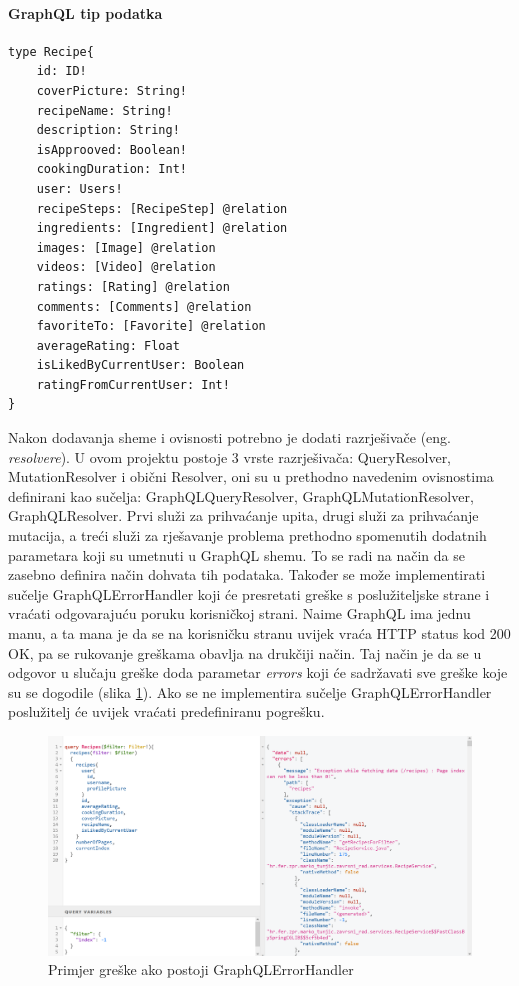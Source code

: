 \documentclass[times, utf8, zavrsni]{fer}
\begin{document}
\paragraph{GraphQL tip podatka}
\label{graphqlType}
\begin{Verbatim}[fontsize=\scriptsize]
type Recipe{
    id: ID!
    coverPicture: String!
    recipeName: String!
    description: String!
    isApprooved: Boolean!
    cookingDuration: Int!
    user: Users!
    recipeSteps: [RecipeStep] @relation
    ingredients: [Ingredient] @relation
    images: [Image] @relation
    videos: [Video] @relation
    ratings: [Rating] @relation
    comments: [Comments] @relation
    favoriteTo: [Favorite] @relation
    averageRating: Float
    isLikedByCurrentUser: Boolean
    ratingFromCurrentUser: Int!
}
\end{Verbatim}
Nakon dodavanja sheme i ovisnosti potrebno je dodati razrješivače (eng. \textit{resolvere}). U ovom projektu postoje 3 vrste razrješivača:
QueryResolver, MutationResolver i obični Resolver, oni su u prethodno navedenim ovisnostima definirani kao sučelja:
GraphQLQueryResolver, GraphQLMutationResolver, GraphQLResolver. Prvi služi za prihvaćanje upita, drugi služi za prihvaćanje
mutacija, a treći služi za rješavanje problema prethodno spomenutih dodatnih parametara koji su umetnuti u GraphQL shemu. To se radi
na način da se zasebno definira način dohvata tih podataka. Također se može implementirati sučelje GraphQLErrorHandler koji
će presretati greške s poslužiteljske strane i vraćati odgovarajuću poruku korisničkoj strani. Naime GraphQL
ima jednu manu, a ta mana je da se na korisničku stranu uvijek vraća HTTP status kod 200 OK, pa se rukovanje greškama
obavlja na drukčiji način. Taj način je da se u odgovor u slučaju greške doda parametar \textit{errors} koji će sadržavati
sve greške koje su se dogodile (slika \ref{fig:Handled error}).
Ako se ne implementira sučelje GraphQLErrorHandler poslužitelj će uvijek vraćati predefiniranu pogrešku. \\
\begin{figure}[h]
      \includegraphics[width=\textwidth]{graphql_handled_error.png}
      \caption{Primjer greške ako postoji GraphQLErrorHandler}
      \label{fig:Handled error}
\end{figure}
\end{document}
